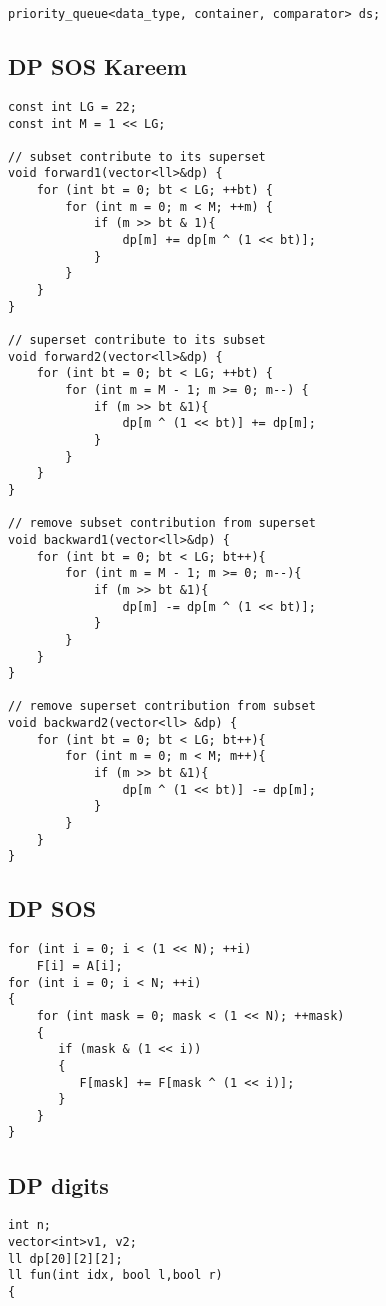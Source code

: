 \documentclass{article}
\begin{document}
{\begin{verbatim}
priority_queue<data_type, container, comparator> ds;
\end{verbatim}

\subsection{DP SOS Kareem}
\begin{verbatim}
const int LG = 22;
const int M = 1 << LG;

// subset contribute to its superset
void forward1(vector<ll>&dp) {
    for (int bt = 0; bt < LG; ++bt) {
        for (int m = 0; m < M; ++m) {
            if (m >> bt & 1){
                dp[m] += dp[m ^ (1 << bt)];
            }
        }
    }
}

// superset contribute to its subset
void forward2(vector<ll>&dp) {
    for (int bt = 0; bt < LG; ++bt) {
        for (int m = M - 1; m >= 0; m--) {
            if (m >> bt &1){
                dp[m ^ (1 << bt)] += dp[m];
            }
        }
    }
}

// remove subset contribution from superset
void backward1(vector<ll>&dp) {
    for (int bt = 0; bt < LG; bt++){
        for (int m = M - 1; m >= 0; m--){
            if (m >> bt &1){
                dp[m] -= dp[m ^ (1 << bt)];
            }
        }
    }
}

// remove superset contribution from subset
void backward2(vector<ll> &dp) {
    for (int bt = 0; bt < LG; bt++){
        for (int m = 0; m < M; m++){
            if (m >> bt &1){
                dp[m ^ (1 << bt)] -= dp[m];
            }
        }
    }
}
\end{verbatim}

\subsection{DP SOS}
\begin{verbatim}
for (int i = 0; i < (1 << N); ++i)  
    F[i] = A[i];  
for (int i = 0; i < N; ++i)  
{  
    for (int mask = 0; mask < (1 << N); ++mask)  
    {  
       if (mask & (1 << i))  
       {  
          F[mask] += F[mask ^ (1 << i)];  
       }  
    }  
}
\end{verbatim}

\subsection{DP digits}
\begin{verbatim}
int n;
vector<int>v1, v2;
ll dp[20][2][2];
ll fun(int idx, bool l,bool r)
{


\end{verbatim}}
\end{document}
